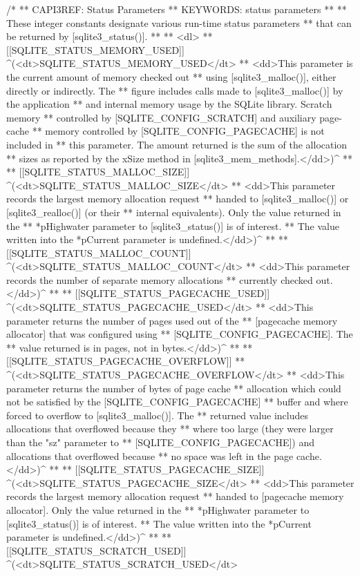 \begin{Codex}[label=sqlite3.h,numbers=left]
{/*
** CAPI3REF: Status Parameters
** KEYWORDS: {status parameters}
**
** These integer constants designate various run-time status parameters
** that can be returned by [sqlite3_status()].
**
** <dl>
** [[SQLITE_STATUS_MEMORY_USED]] ^(<dt>SQLITE_STATUS_MEMORY_USED</dt>
** <dd>This parameter is the current amount of memory checked out
** using [sqlite3_malloc()], either directly or indirectly.  The
** figure includes calls made to [sqlite3_malloc()] by the application
** and internal memory usage by the SQLite library.  Scratch memory
** controlled by [SQLITE_CONFIG_SCRATCH] and auxiliary page-cache
** memory controlled by [SQLITE_CONFIG_PAGECACHE] is not included in
** this parameter.  The amount returned is the sum of the allocation
** sizes as reported by the xSize method in [sqlite3_mem_methods].</dd>)^
**
** [[SQLITE_STATUS_MALLOC_SIZE]] ^(<dt>SQLITE_STATUS_MALLOC_SIZE</dt>
** <dd>This parameter records the largest memory allocation request
** handed to [sqlite3_malloc()] or [sqlite3_realloc()] (or their
** internal equivalents).  Only the value returned in the
** *pHighwater parameter to [sqlite3_status()] is of interest.  
** The value written into the *pCurrent parameter is undefined.</dd>)^
**
** [[SQLITE_STATUS_MALLOC_COUNT]] ^(<dt>SQLITE_STATUS_MALLOC_COUNT</dt>
** <dd>This parameter records the number of separate memory allocations
** currently checked out.</dd>)^
**
** [[SQLITE_STATUS_PAGECACHE_USED]] ^(<dt>SQLITE_STATUS_PAGECACHE_USED</dt>
** <dd>This parameter returns the number of pages used out of the
** [pagecache memory allocator] that was configured using 
** [SQLITE_CONFIG_PAGECACHE].  The
** value returned is in pages, not in bytes.</dd>)^
**
** [[SQLITE_STATUS_PAGECACHE_OVERFLOW]] 
** ^(<dt>SQLITE_STATUS_PAGECACHE_OVERFLOW</dt>
** <dd>This parameter returns the number of bytes of page cache
** allocation which could not be satisfied by the [SQLITE_CONFIG_PAGECACHE]
** buffer and where forced to overflow to [sqlite3_malloc()].  The
** returned value includes allocations that overflowed because they
** where too large (they were larger than the "sz" parameter to
** [SQLITE_CONFIG_PAGECACHE]) and allocations that overflowed because
** no space was left in the page cache.</dd>)^
**
** [[SQLITE_STATUS_PAGECACHE_SIZE]] ^(<dt>SQLITE_STATUS_PAGECACHE_SIZE</dt>
** <dd>This parameter records the largest memory allocation request
** handed to [pagecache memory allocator].  Only the value returned in the
** *pHighwater parameter to [sqlite3_status()] is of interest.  
** The value written into the *pCurrent parameter is undefined.</dd>)^
**
** [[SQLITE_STATUS_SCRATCH_USED]] ^(<dt>SQLITE_STATUS_SCRATCH_USED</dt>
}
\end{Codex}
